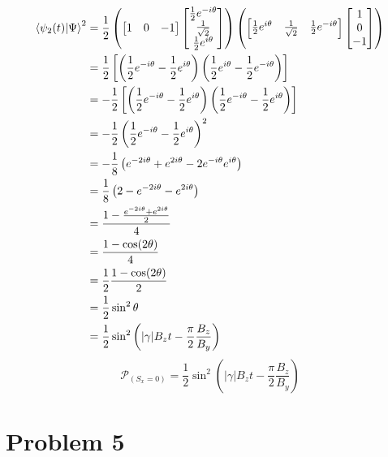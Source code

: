 \documentclass[letter, 10pts]{article}
\begin{document}
\begin{align*}
	\braket{\psi_2(t) | \Psi} ^2 &= 
	\frac{1}{2} 
	\left(
	\begin{bmatrix} 1&0&-1 \end{bmatrix} 
 \begin{bmatrix} \frac{1}{2} e^{- i \theta} \\ \frac{1}{\sqrt{2} } \\ \frac{1}{2}e^{i \theta} \end{bmatrix} 
	\right)
	\left(
	\begin{bmatrix} \frac{1}{2} e^{ i \theta} & \frac{1}{\sqrt{2} } & \frac{1}{2}e^{- i \theta} \end{bmatrix} 
	\begin{bmatrix} 1\\0\\-1 \end{bmatrix} 
	\right) \\
	&= 
\frac{1}{2}
\left[
	\left(\frac{1}{2}e^{-i \theta} - \frac{1}{2} e^{i \theta}\right)
	\left(\frac{1}{2}e^{i \theta} - \frac{1}{2}e^{- i \theta}\right)
\right]
	\\
	&= -
\frac{1}{2}
\left[
	\left(\frac{1}{2}e^{-i \theta} - \frac{1}{2} e^{i \theta}\right)
	\left(\frac{1}{2}e^{-i \theta} - \frac{1}{2}e^{ i \theta}\right)
\right]
	\\
	&= -
\frac{1}{2}
	\left(\frac{1}{2}e^{-i \theta} - \frac{1}{2} e^{i \theta}\right)^2
	\\
	&= 
- \frac{1}{8} 
\left(e^{- 2 i \theta} + e^{2 i \theta} - 2 e^{-i \theta} e^{ i \theta}\right)
	\\
	&= 
	\frac{1}{8} 
	\left(
2 - e^{- 2 i \theta} - e^{ 2 i \theta}
	\right)
	\\
	&= 
\frac{1 - \frac{e^{- 2 i \theta } + e^{ 2 i \theta} }{2} }{4}
	\\ 
	&= 
\frac{1 - \cos(2 \theta )}{4}
	\\ 
	&= \frac{1}{2}
\frac{1 - \cos(2 \theta )}{2}
	\\ 
	&= \frac{1}{2}
	\sin ^2 \theta 
	\\ 
	&= \frac{1}{2}
\sin^2 \left(
|\gamma| B_z t - \frac{\pi}{2} \frac{B_z}{B_y}
\right)
	\\
\end{align*}
 \[
	 \mathcal P _{(S_x = 0) }
	= \frac{1}{2}
\sin^2 \left(
|\gamma| B_z t - \frac{\pi}{2} \frac{B_z}{B_y}
\right)
 \] 

	\newpage
\section*{Problem 5} 
\end{document}
